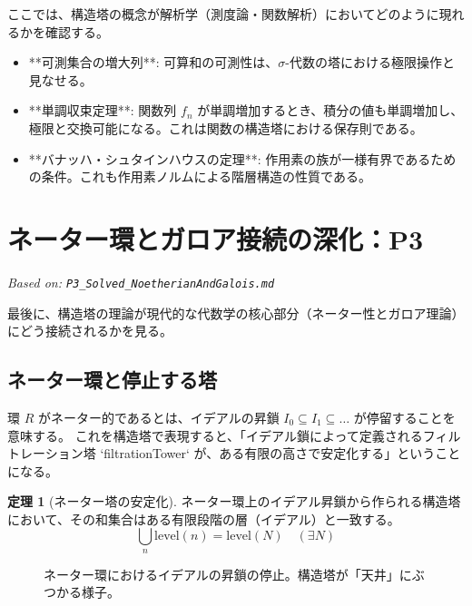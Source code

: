 \documentclass[a4paper,11pt]{ltjsarticle}
\theoremstyle{definition}
\newtheorem{theorem}[definition]{定理}
\begin{document}
ここでは、構造塔の概念が解析学（測度論・関数解析）においてどのように現れるかを確認する。

\begin{itemize}
    \item **可測集合の増大列**: 可算和の可測性は、$\sigma$-代数の塔における極限操作と見なせる。
    \item **単調収束定理**: 関数列 $f_n$ が単調増加するとき、積分の値も単調増加し、極限と交換可能になる。これは関数の構造塔における保存則である。
    \item **バナッハ・シュタインハウスの定理**: 作用素の族が一様有界であるための条件。これも作用素ノルムによる階層構造の性質である。
\end{itemize}

\section{ネーター環とガロア接続の深化：P3}
\label{sec:p3}
\textit{Based on: \texttt{P3\_Solved\_NoetherianAndGalois.md}}

最後に、構造塔の理論が現代的な代数学の核心部分（ネーター性とガロア理論）にどう接続されるかを見る。

\subsection{ネーター環と停止する塔}
環 $R$ がネーター的であるとは、イデアルの昇鎖 $I_0 \subseteq I_1 \subseteq \dots$ が停留することを意味する。
これを構造塔で表現すると、「イデアル鎖によって定義されるフィルトレーション塔 `filtrationTower` が、ある有限の高さで安定化する」ということになる。

\begin{theorem}[ネーター塔の安定化]
ネーター環上のイデアル昇鎖から作られる構造塔において、その和集合はある有限段階の層（イデアル）と一致する。
\[ \bigcup_{n} \mathrm{level}(n) = \mathrm{level}(N) \quad (\exists N) \]
\end{theorem}

\begin{figure}[h]
\centering
{}
\caption{ネーター環におけるイデアルの昇鎖の停止。構造塔が「天井」にぶつかる様子。}
\end{figure}
\end{document}
